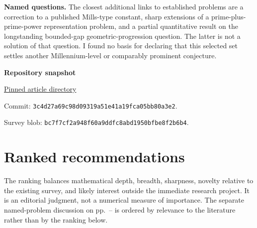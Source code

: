 \documentclass[11pt]{article}
\begin{document}
\textbf{Named questions.} The closest additional links to established problems are a correction to a published Mills-type constant, sharp extensions of a prime-plus-prime-power representation problem, and a partial quantitative result on the longstanding bounded-gap geometric-progression question. The latter is not a solution of that question. I found no basis for declaring that this selected set settles another Millennium-level or comparably prominent conjecture.

\vfill
\textbf{Repository snapshot}\par
\small\href{https://github.com/VladimirReshetnikov/ProveIt/tree/3c4d27a69c98d09319a51e41a19fca05bb80a3e2/Analysis/GeneralizedRiemannHypothesis/Article}{Pinned article directory}\par
Commit: \texttt{3c4d27a69c98d09319a51e41a19fca05bb80a3e2}.\par
Survey blob: \texttt{bc7f7cf2a948f60a9ddfc8abd1950bfbe8f2b6b4}.
\clearpage
\section*{Ranked recommendations}
The ranking balances mathematical depth, breadth, sharpness, novelty relative to the existing survey, and likely interest outside the immediate research project. It is an editorial judgment, not a numerical measure of importance. The separate named-problem discussion on pp.~\pageref{named}--\pageref{namedend} is ordered by relevance to the literature rather than by the ranking below.
\end{document}
